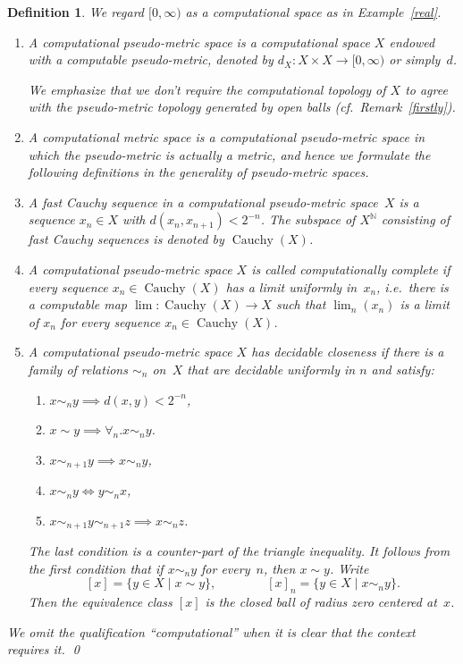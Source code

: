 \documentclass[10pt]{article}
\newcommand{\cauchy}{\operatorname{Cauchy}}
\newtheorem{Def}[cor]{Definition}
\newenvironment{definition}{\begin{Def}\em}{\end{Def}}
\newcommand{\N}{\mathbb{N}}
\begin{document}
\begin{definition} We regard $[0,\infty)$ as a computational space as
  in Example~\ref{real}.
\begin{enumerate}
\item  A \emph{computational pseudo-metric space} is a computational space $X$
   endowed with a computable pseudo-metric, denoted by $d_X \colon X
   \times X \to [0,\infty)$ or simply~$d$. 

   We emphasize that we don't require the computational topology
   of $X$ to agree with the pseudo-metric topology generated by open
   balls (cf.\ Remark~\ref{firstly}).

 \item A \emph{computational metric space} is a computational
   pseudo-metric space in which the pseudo-metric is actually a
   metric, and hence we formulate the following definitions in
   the generality of pseudo-metric spaces.

 \item A \emph{fast Cauchy sequence} in a computational pseudo-metric
   space~$X$ is a sequence $x_n \in X$ with $d(x_n,x_{n+1}) < 2^{-n}$.
   The subspace of $X^\N$ consisting of fast Cauchy sequences is
   denoted by $\cauchy(X)$.

 \item A computational pseudo-metric space $X$ is called
   \emph{computationally complete} if every sequence $x_n \in
   \cauchy(X)$ has a limit uniformly in~$x_n$, i.e.\ there is a
   computable map $\lim \colon \cauchy(X) \to X$ such that $\lim_n
   (x_n)$ is a limit of $x_n$ for every sequence $x_n \in \cauchy(X)$.
\item A computational pseudo-metric space $X$ has \emph{decidable
    closeness} if there is a family of relations
  $\sim_n$ on~$X$ that are decidable uniformly in $n$ and satisfy:
\begin{enumerate}
\item $x \sim_n y \implies d(x,y) < 2^{-n}$, 
\item $x \sim y \implies \forall_n. x \sim_n y$.
\item $x \sim_{n+1} y \implies x \sim_n y$,
\item $x \sim_n y \iff y \sim_n x$,
\item $x \sim_{n+1} y \sim_{n+1} z \implies x \sim_n z$.
\end{enumerate}
The last condition is a counter-part of the triangle inequality.  It
follows from the first condition that if $x \sim_n y$ for every~$n$,
then $x \sim y$.  Write
\[
[x] = \{ y \in X \mid x \sim y\}, \qquad\qquad
[x]_n = \{ y \in X \mid x \sim_n y\}.
\]
Then the equivalence class $[x]$ is the closed ball
of radius zero centered at~$x$.
\end{enumerate}
We omit the qualification ``computational'' when it is clear
that the context requires it. \qed
\end{definition}
\end{document}
